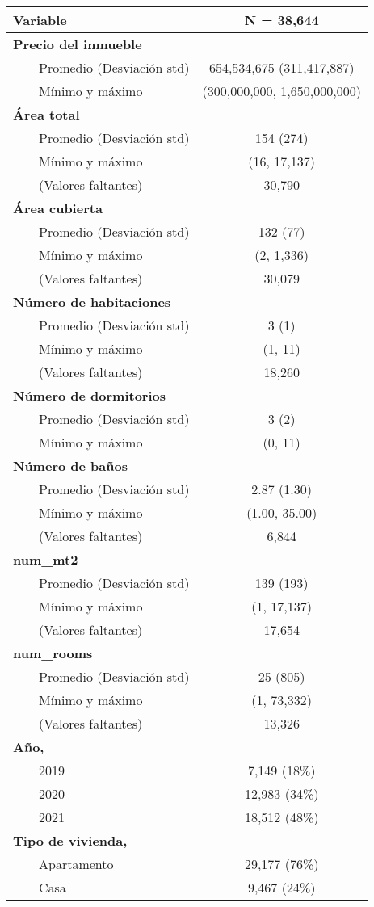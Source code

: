 \begin{longtable}{lc}
\toprule
\textbf{Variable} & \textbf{N = 38,644} \\ 
\midrule\addlinespace[2.5pt]
\textbf{Precio del inmueble} &  \\ 
    Promedio (Desviación std) & 654,534,675 (311,417,887) \\ 
    Mínimo y máximo & (300,000,000, 1,650,000,000) \\ 
\textbf{Área total} &  \\ 
    Promedio (Desviación std) & 154 (274) \\ 
    Mínimo y máximo & (16, 17,137) \\ 
    (Valores faltantes) & 30,790 \\ 
\textbf{Área cubierta} &  \\ 
    Promedio (Desviación std) & 132 (77) \\ 
    Mínimo y máximo & (2, 1,336) \\ 
    (Valores faltantes) & 30,079 \\ 
\textbf{Número de habitaciones} &  \\ 
    Promedio (Desviación std) & 3 (1) \\ 
    Mínimo y máximo & (1, 11) \\ 
    (Valores faltantes) & 18,260 \\ 
\textbf{Número de dormitorios} &  \\ 
    Promedio (Desviación std) & 3 (2) \\ 
    Mínimo y máximo & (0, 11) \\ 
\textbf{Número de baños} &  \\ 
    Promedio (Desviación std) & 2.87 (1.30) \\ 
    Mínimo y máximo & (1.00, 35.00) \\ 
    (Valores faltantes) & 6,844 \\ 
\textbf{num_mt2} &  \\ 
    Promedio (Desviación std) & 139 (193) \\ 
    Mínimo y máximo & (1, 17,137) \\ 
    (Valores faltantes) & 17,654 \\ 
\textbf{num_rooms} &  \\ 
    Promedio (Desviación std) & 25 (805) \\ 
    Mínimo y máximo & (1, 73,332) \\ 
    (Valores faltantes) & 13,326 \\ 
\textbf{Año, } &  \\ 
    2019 & 7,149  (18\%) \\ 
    2020 & 12,983  (34\%) \\ 
    2021 & 18,512  (48\%) \\ 
\textbf{Tipo de vivienda, } &  \\ 
    Apartamento & 29,177  (76\%) \\ 
    Casa & 9,467  (24\%) \\ 
\bottomrule
\end{longtable}

